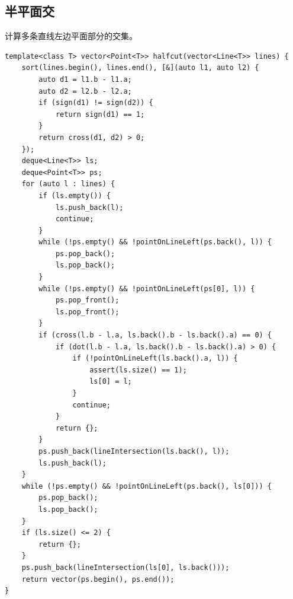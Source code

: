 \subsection{半平面交}
计算多条直线左边平面部分的交集。
\begin{lstlisting}[caption={}]
template<class T> vector<Point<T>> halfcut(vector<Line<T>> lines) {
    sort(lines.begin(), lines.end(), [&](auto l1, auto l2) {
        auto d1 = l1.b - l1.a;
        auto d2 = l2.b - l2.a;
        if (sign(d1) != sign(d2)) {
            return sign(d1) == 1;
        }
        return cross(d1, d2) > 0;
    });
    deque<Line<T>> ls;
    deque<Point<T>> ps;
    for (auto l : lines) {
        if (ls.empty()) {
            ls.push_back(l);
            continue;
        }
        while (!ps.empty() && !pointOnLineLeft(ps.back(), l)) {
            ps.pop_back();
            ls.pop_back();
        }
        while (!ps.empty() && !pointOnLineLeft(ps[0], l)) {
            ps.pop_front();
            ls.pop_front();
        }
        if (cross(l.b - l.a, ls.back().b - ls.back().a) == 0) {
            if (dot(l.b - l.a, ls.back().b - ls.back().a) > 0) {
                if (!pointOnLineLeft(ls.back().a, l)) {
                    assert(ls.size() == 1);
                    ls[0] = l;
                }
                continue;
            }
            return {};
        }
        ps.push_back(lineIntersection(ls.back(), l));
        ls.push_back(l);
    }
    while (!ps.empty() && !pointOnLineLeft(ps.back(), ls[0])) {
        ps.pop_back();
        ls.pop_back();
    }
    if (ls.size() <= 2) {
        return {};
    }
    ps.push_back(lineIntersection(ls[0], ls.back()));
    return vector(ps.begin(), ps.end());
}
\end{lstlisting}

